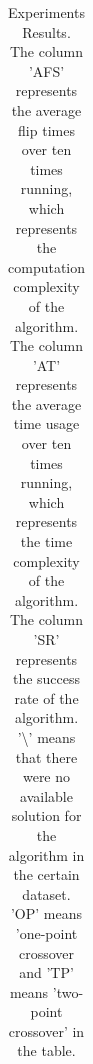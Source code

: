 \begin{table}
{\begin{tabular}{|c|c|c|c|c|c|c|c|c|c|c|c|c|c|c|c|c|c|c|c|}
\end{tabular}
}
\caption{Experiments Results. The column 'AFS' represents the average flip times over ten times running, which represents the computation complexity of the algorithm. The column 'AT' represents the average time usage over ten times running, which represents the time complexity of the algorithm. The column 'SR' represents the success rate of the algorithm. '\textbackslash' means that there were no available solution for the algorithm in the certain dataset. 'OP' means 'one-point crossover and 'TP' means 'two-point crossover' in the table.}
\label{tab:results.}
\end{table} 
\clearpage